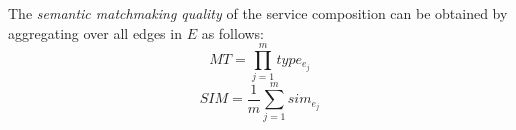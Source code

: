 \documentclass{llncs}
\begin{document}







The \emph{semantic matchmaking quality} of the service composition can be obtained by aggregating over all edges in $E$ as follows:
\vspace{-0.2cm}
\begin{equation}
\label{equation6}
MT {=} \prod_{j=1}^{m} type_ {e_{j}}
\end{equation}
\begin{equation}
\label{equation7}
SIM {=} \frac{1}{m}\sum_{j=1}^m sim_ {e_{j}}
\end{equation}
\end{document}
